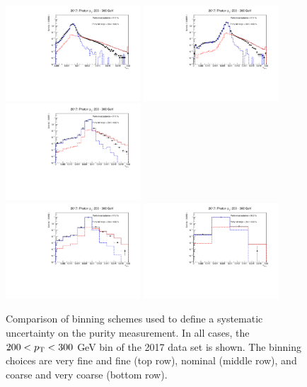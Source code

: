 \begin{figure}[htbp]
    \centering
        \includegraphics[width=0.45\textwidth]{PhotonPurity/fit_2017_pt200-300_vfine.pdf}
        \includegraphics[width=0.45\textwidth]{PhotonPurity/fit_2017_pt200-300_fine.pdf} \\
        \includegraphics[width=0.45\textwidth]{PhotonPurity/fit_2017_pt200-300_nominal.pdf} \\
        \includegraphics[width=0.45\textwidth]{PhotonPurity/fit_2017_pt200-300_coarse.pdf}
        \includegraphics[width=0.45\textwidth]{PhotonPurity/fit_2017_pt200-300_vcoarse.pdf}
    \caption{Comparison of binning schemes used to define a systematic uncertainty on the purity measurement. In all cases, the 
    $200<p_{\textrm{T}}<300$ GeV bin of the 2017 data set is shown. The binning choices are very fine and fine (top row), nominal (middle row), 
    and coarse and very coarse (bottom row).}
    \label{fig:purity_binning}
\end{figure}

\clearpage